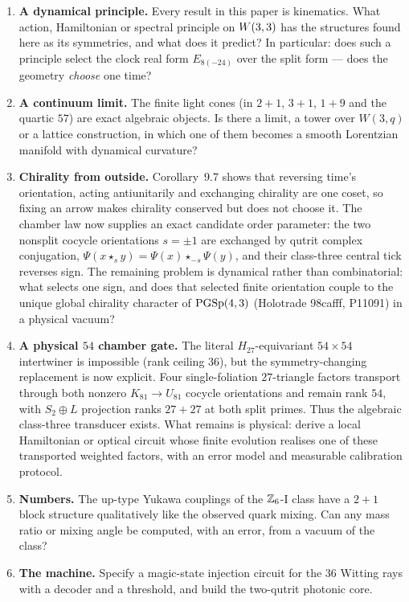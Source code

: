 \begin{enumerate}[label=\textbf{\arabic*.},leftmargin=1.6em,itemsep=5pt]
\begin{itemize}
      \end{itemize}
\item \textbf{A dynamical principle.} Every result in this paper is kinematics. What
      action, Hamiltonian or spectral principle on $W(3,3)$ has the structures found here as its
      symmetries, and what does it predict? In particular: does such a principle select the
      clock real form $E_{8(-24)}$ over the split form --- does the geometry
      \emph{choose} one time?
\item \textbf{A continuum limit.} The finite light cones (in $2+1$, $3+1$, $1+9$ and the
      quartic $57$) are exact algebraic objects. Is there a limit, a tower over $W(3,q)$ or a
      lattice construction, in which one of them becomes a smooth Lorentzian manifold with
      dynamical curvature?
\item \textbf{Chirality from outside.} Corollary~9.7 shows that reversing time's orientation,
      acting antiunitarily and exchanging chirality are one coset, so fixing an arrow makes
      chirality conserved but does not choose it. The chamber law now supplies an exact candidate
      order parameter: the two nonsplit cocycle orientations $s=\pm1$ are exchanged by qutrit
      complex conjugation, $\Psi(x\star_s y)=\Psi(x)\star_{-s}\Psi(y)$, and their class-three
      central tick reverses sign. 
      The remaining problem is dynamical rather than combinatorial: what selects one sign, and does
      that selected finite orientation couple to the unique global chirality character of
      $\mathrm{PGSp}(4,3)$ (Holotrade 98cafff, P11091) in a physical vacuum?
\item \textbf{A physical $54$ chamber gate.} The literal $H_{27}$-equivariant
      $54\times54$ intertwiner is impossible (rank ceiling $36$), but the symmetry-changing
      replacement is now explicit. Four single-foliation $27$-triangle factors transport through
      both nonzero $K_{81}\to U_{81}$ cocycle orientations and remain rank $54$, with
      $S_2\oplus L$ projection ranks $27+27$ at both split primes. Thus the algebraic
      class-three transducer exists. 
      What remains is physical: derive a local Hamiltonian or optical circuit whose finite
      evolution realises one of these transported weighted factors, with an error model and
      measurable calibration protocol.
\item \textbf{Numbers.} The up-type Yukawa couplings of the $\mathbb{Z}_6$-I class have a $2+1$
      block structure qualitatively like the observed quark mixing. Can any mass ratio or
      mixing angle be computed, with an error, from a vacuum of the class?
\item \textbf{The machine.} Specify a magic-state injection circuit for the $36$ Witting
      rays with a decoder and a threshold, and build the two-qutrit photonic core.
\end{enumerate}


